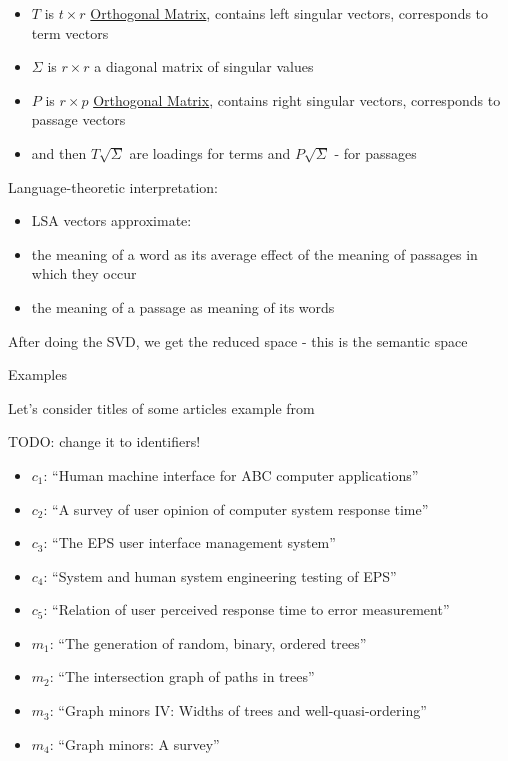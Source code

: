 \begin{itemize}
\itemsep1pt\parskip0pt
\item
  $T$ is $t \times r$
  \href{Orthogonal Matrix}{Orthogonal Matrix}, contains left singular
  vectors, corresponds to term vectors
\item
  $\Sigma$ is $r \times r$ a diagonal
  matrix of singular values
\item
  $P$ is $r \times p$
  \href{Orthogonal Matrix}{Orthogonal Matrix}, contains right singular
  vectors, corresponds to passage vectors
\item
  and then $T \sqrt\Sigma$ are loadings
  for terms and $P \sqrt\Sigma$ - for
  passages
\end{itemize}

Language-theoretic interpretation:

\begin{itemize}
\itemsep1pt\parskip0pt
\item
  LSA vectors approximate:
\item
  the meaning of a word as its average effect of the meaning of passages
  in which they occur
\item
  the meaning of a passage as meaning of its words
\end{itemize}

After doing the SVD, we get the reduced space - this is the semantic
space

Examples

Let's consider titles of some articles example from \cite{landauer1998introduction}


TODO: change it to identifiers!

\begin{itemize}
\itemsep1pt\parskip0pt
\item
  $c_1$: ``Human machine interface for ABC computer applications''
\item
  $c_2$: ``A survey of user opinion of computer system response
  time''
\item
  $c_3$: ``The EPS user interface management system''
\item
  $c_4$: ``System and human system engineering testing of EPS''
\item
  $c_5$: ``Relation of user perceived response time to error
  measurement''
\item
  $m_1$: ``The generation of random, binary, ordered trees''
\item
  $m_2$: ``The intersection graph of paths in trees''
\item
  $m_3$: ``Graph minors IV: Widths of trees and well-quasi-ordering''
\item
  $m_4$: ``Graph minors: A survey''
\end{itemize}

